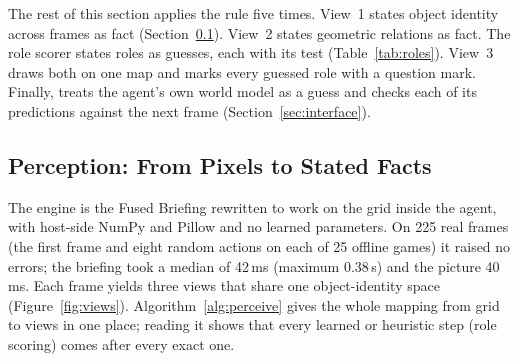 The rest of this section applies the rule five times. View~1 states object identity across frames as fact (Section~\ref{sec:perception}). 
View~2 states geometric relations as fact. The role scorer states roles as guesses, each with its test (Table~\ref{tab:roles}). View~3 draws both on one map and marks every guessed role with a question mark. Finally,  treats the agent's own world model as a guess and checks each of its predictions against the next frame (Section~\ref{sec:interface}).

\subsection{Perception: From Pixels to Stated Facts}
\label{sec:perception}

The engine is the Fused Briefing rewritten to work on the grid inside the agent, with host-side NumPy and Pillow and no learned parameters. On 225 real frames (the first frame and eight random actions on each of 25 offline games) it raised no errors; the briefing took a median of 42\,ms (maximum 0.38\,s) and the picture 40\,ms. Each frame yields three views that share one object-identity space (Figure~\ref{fig:views}). Algorithm~\ref{alg:perceive} gives the whole mapping from grid to views in one place; reading it shows that every learned or heuristic step (role scoring) comes after every exact one.

